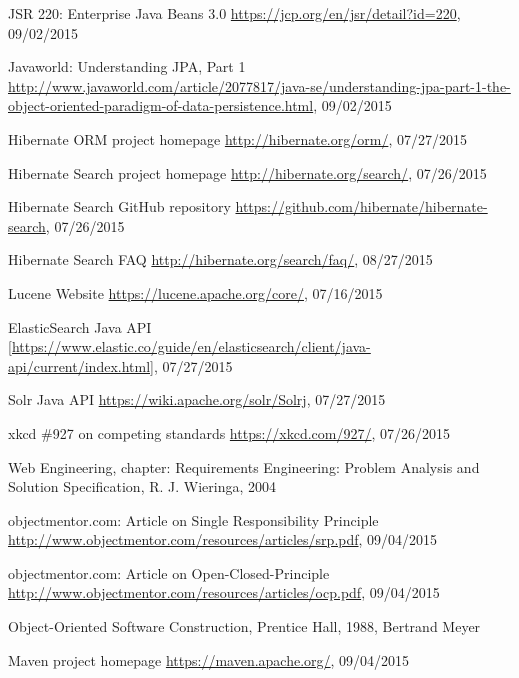 %
%
\begin{thebibliography}{100}
	
	 JSR 220: Enterprise Java Beans 3.0
	\url{https://jcp.org/en/jsr/detail?id=220}, 09/02/2015
	
	 Javaworld: Understanding JPA, Part 1
	\url{http://www.javaworld.com/article/2077817/java-se/understanding-jpa-part-1-the-object-oriented-paradigm-of-data-persistence.html}, 09/02/2015
	
	 Hibernate ORM project homepage
	\url{http://hibernate.org/orm/}, 07/27/2015
	
	 Hibernate Search project homepage
	\url{http://hibernate.org/search/}, 07/26/2015
	
	 Hibernate Search GitHub repository
	\url{https://github.com/hibernate/hibernate-search}, 07/26/2015
	
	 Hibernate Search FAQ
	\url{http://hibernate.org/search/faq/}, 08/27/2015
	
	 Lucene Website
	\url{https://lucene.apache.org/core/}, 07/16/2015
	
	 ElasticSearch Java API
	\url{[https://www.elastic.co/guide/en/elasticsearch/client/java-api/current/index.html]}, 07/27/2015
	
	 Solr Java API
	\url{https://wiki.apache.org/solr/Solrj}, 07/27/2015
	
	 xkcd \#927 on competing standards
	\url{https://xkcd.com/927/}, 07/26/2015
	
	 Web Engineering, chapter: Requirements Engineering: Problem Analysis and Solution Specification, R. J. Wieringa, 2004
	
	 objectmentor.com: Article on Single Responsibility Principle
	\url{http://www.objectmentor.com/resources/articles/srp.pdf}, 09/04/2015
	
	 objectmentor.com: Article on Open-Closed-Principle
	\url{http://www.objectmentor.com/resources/articles/ocp.pdf}, 09/04/2015
	
	 Object-Oriented Software Construction, Prentice Hall, 1988, Bertrand Meyer
	
	 Maven project homepage
	\url{https://maven.apache.org/}, 09/04/2015
	

\end{thebibliography}

